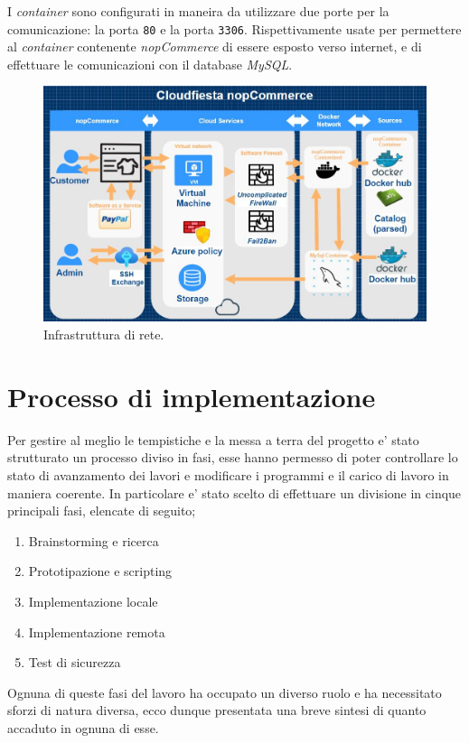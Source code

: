 \documentclass[a4paper]{report}
\begin{document}
		I \emph{container} sono configurati in maneira da utilizzare due porte per la comunicazione: la porta
		\texttt{80} e la porta \texttt{3306}. Rispettivamente usate per permettere al \emph{container} contenente
		\emph{nopCommerce} di essere esposto verso internet, e di effettuare le comunicazioni con il
		database \emph{MySQL}.

		\begin{figure}[H]
			\includegraphics[width=\textwidth]{DiagrammaDiRete.jpg}
			\caption{Infrastruttura di rete.}\label{fig:architettura_di_rete}
		\end{figure}
 

\chapter{Processo di implementazione}\label{processo_di_implementazione}
	Per gestire al meglio le tempistiche e la messa a terra del progetto e' stato strutturato un processo diviso in
	fasi, esse hanno permesso di poter controllare lo stato di avanzamento dei lavori e modificare i programmi e il
	carico di lavoro in maniera coerente. In particolare e' stato scelto di effettuare un divisione in  cinque
	principali fasi, elencate di seguito;
	\begin{enumerate}
		\item Brainstorming e ricerca
		\item Prototipazione e scripting
		\item Implementazione locale
		\item Implementazione remota
		\item Test di sicurezza
	\end{enumerate}
	Ognuna di queste fasi del lavoro ha occupato un diverso ruolo e ha necessitato sforzi di natura diversa, ecco dunque
	presentata una breve sintesi di quanto accaduto in ognuna di esse.
\end{document}
